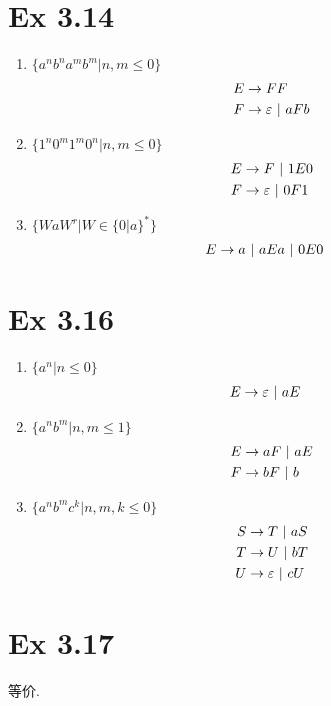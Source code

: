 \section{Ex 3.14}
\begin{solve}
  \begin{enumerate}
  \item $\{a^nb^na^mb^m|n, m \le 0\}$
    \begin{align*}
      E & \rightarrow FF\\
      F & \rightarrow \varepsilon \ |\  aFb
    \end{align*}

  \item $\{1^n0^m1^m0^n | n, m \le 0\}$
    \begin{align*}
      E & \rightarrow F \ |\  1E0\\
      F & \rightarrow \varepsilon \ |\  0F1
    \end{align*}
  \item $\{WaW^r|W\in\{0|a\}^*\}$
    \begin{align*}
      E & \rightarrow a \ |\  aEa \ |\  0E0
    \end{align*}
  \end{enumerate}
\end{solve}

\section{Ex 3.16}
\begin{solve}
  \begin{enumerate}
  \item $\{a^n|n\le 0\}$
    \begin{align*}
      E & \rightarrow \varepsilon \ |\  aE
    \end{align*}
  \item $\{a^nb^m|n,m\le 1\}$
    \begin{align*}
      E & \rightarrow aF \ |\  aE\\
      F & \rightarrow bF \ |\  b
    \end{align*}
  \item $\{a^nb^mc^k | n, m, k \le 0\}$
    \begin{align*}
      S & \rightarrow T \ |\  aS\\
      T & \rightarrow U \ |\  bT\\
      U & \rightarrow \varepsilon \ |\  cU
    \end{align*}
  \end{enumerate}
\end{solve}

\section{Ex 3.17}

\begin{solve}
  等价.
\end{solve}



